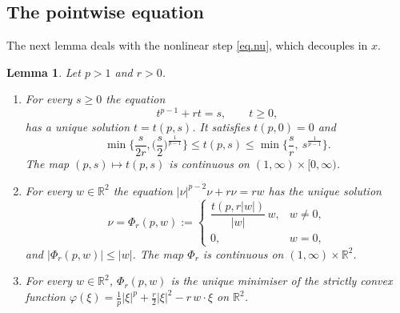 \documentclass[11pt]{amsart}
\newcommand{\R}{\mathbb R}
\newtheorem{lema}[teo]{Lemma}
\theoremstyle{definition}
\theoremstyle{remark}
\numberwithin{equation}{section}
\begin{document}
\subsection{The pointwise equation}
The next lemma deals with the nonlinear step \eqref{eq.nu}, which decouples in $x$.

\begin{lema}\label{lem.scalar}
Let $p>1$ and $r>0$.
\begin{enumerate}
\item[(a)] For every $s\ge0$ the equation
\begin{equation}\label{eq.scalar}
t^{p-1}+rt=s,\qquad t\ge0,
\end{equation}
has a unique solution $t=t(p,s)$. It satisfies $t(p,0)=0$ and
\begin{equation}\label{eq.bracket}
\min\Big\{\frac{s}{2r},\Big(\frac s2\Big)^{\frac1{p-1}}\Big\}\le t(p,s)\le\min\Big\{\frac sr,\ s^{\frac1{p-1}}\Big\}.
\end{equation}
The map $(p,s)\mapsto t(p,s)$ is continuous on $(1,\infty)\times[0,\infty)$.
\item[(b)] For every $w\in\R^2$ the equation $|\nu|^{p-2}\nu+r\nu=rw$ has the unique solution
\begin{equation}\label{eq.nu.formula}
\nu=\Phi_r(p,w):=\begin{cases}\dfrac{t(p,r|w|)}{|w|}\,w,& w\neq0,\\[2mm] 0,& w=0,\end{cases}
\end{equation}
and $|\Phi_r(p,w)|\le|w|$. The map $\Phi_r$ is continuous on $(1,\infty)\times\R^2$.
\item[(c)] For every $w\in\R^2$, $\Phi_r(p,w)$ is the unique minimiser of the strictly convex function
$\varphi(\xi)=\frac1p|\xi|^p+\frac r2|\xi|^2-r\,w\cdot\xi$ on $\R^2$.
\end{enumerate}
\end{lema}
\end{document}

